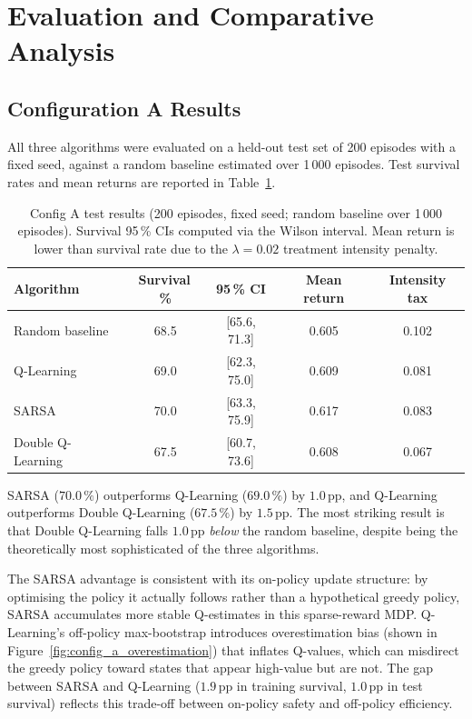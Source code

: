 \documentclass[11pt,a4paper]{article}
\begin{document}
\section{Evaluation and Comparative Analysis}
\label{sec:evaluation}

\subsection{Configuration A Results}
\label{sec:eval_a}

All three algorithms were evaluated on a held-out test set of 200 episodes
with a fixed seed, against a random baseline estimated over 1\,000 episodes.
Test survival rates and mean returns are reported in Table~\ref{tab:results_a}.

\begin{table}[H]
\centering\small
\caption{Config A test results (200 episodes, fixed seed; random baseline over
         1\,000 episodes). Survival 95\,\% CIs computed via the Wilson interval.
         Mean return is lower than survival rate due to the $\lambda=0.02$
         treatment intensity penalty.}
\label{tab:results_a}
\begin{tabular}{lcccc}
\toprule
Algorithm & Survival\,\% & 95\,\% CI & Mean return & Intensity tax \\
\midrule
Random baseline   & 68.5 & [65.6, 71.3] & 0.605 & 0.102 \\
Q-Learning        & 69.0 & [62.3, 75.0] & 0.609 & 0.081 \\
SARSA             & 70.0 & [63.3, 75.9] & 0.617 & 0.083 \\
Double Q-Learning & 67.5 & [60.7, 73.6] & 0.608 & 0.067 \\
\bottomrule
\end{tabular}
\end{table}

SARSA ($70.0\,\%$) outperforms Q-Learning ($69.0\,\%$) by $1.0$\,pp, and
Q-Learning outperforms Double Q-Learning ($67.5\,\%$) by $1.5$\,pp. The
most striking result is that Double Q-Learning falls $1.0$\,pp \emph{below}
the random baseline, despite being the theoretically most sophisticated of
the three algorithms.

The SARSA advantage is consistent with its on-policy update structure: by
optimising the policy it actually follows rather than a hypothetical greedy
policy, SARSA accumulates more stable Q-estimates in this sparse-reward MDP.
Q-Learning's off-policy max-bootstrap introduces overestimation bias (shown
in Figure~\ref{fig:config_a_overestimation}) that inflates Q-values, which
can misdirect the greedy policy toward states that appear high-value but are
not. The gap between SARSA and Q-Learning ($1.9$\,pp in training survival,
$1.0$\,pp in test survival) reflects this trade-off between on-policy safety
and off-policy efficiency.
\end{document}
